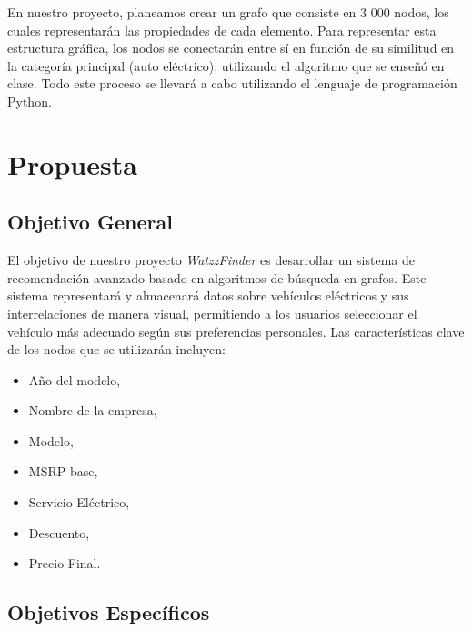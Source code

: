 \documentclass[12pt]{article}
\begin{document}
En nuestro proyecto, planeamos crear un grafo que consiste en 3 000 nodos, los cuales representarán las propiedades de cada elemento. Para representar esta estructura gráfica, los nodos se conectarán entre sí en función de su similitud en la categoría principal (auto eléctrico), utilizando el algoritmo que se enseñó en clase. Todo este proceso se llevará a cabo utilizando el lenguaje de programación Python.



\section{Propuesta}


\subsection{Objetivo General}

El objetivo de nuestro proyecto \textit{WatzzFinder} es desarrollar un sistema de recomendación avanzado basado en algoritmos de búsqueda en grafos. Este sistema representará y almacenará datos sobre vehículos eléctricos y sus interrelaciones de manera visual, permitiendo a los usuarios seleccionar el vehículo más adecuado según sus preferencias personales. Las características clave de los nodos que se utilizarán incluyen:
\begin{itemize}
    \item Año del modelo,
    \item Nombre de la empresa,
    \item Modelo,
    \item MSRP base,
    \item Servicio Eléctrico,
    \item Descuento,
    \item Precio Final.
\end{itemize}



\subsection{Objetivos Específicos}
\end{document}
